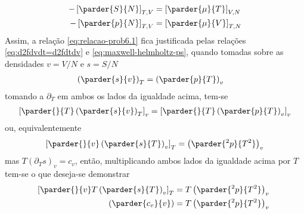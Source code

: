 \begin{prob}
\begin{sol}
\begin{subequations}
\begin{align}
			-\left[\parder{S}{N}\right]_{T,V}&=\left[\parder{\mu}{T}\right]_{V,N}\label{eq:maxwell-helmholtz-sm}\\
			-\left[\parder{p}{N}\right]_{T,V}&=\left[\parder{\mu}{V}\right]_{T,N}\label{eq:maxwell-helmholtz-pm}
		\end{align}
	\end{subequations}
	Assim, a relação \eqref{eq:relacao-prob6.1} fica justificada pelas relações \eqref{eq:d2fdvdt=d2fdtdv} e \eqref{eq:maxwell-helmholtz-ps}, quando tomadas sobre as densidades $v=V/N$ e $s=S/N$
	\begin{align}
		\left(\parder{s}{v}\right)_{T}&=\left(\parder{p}{T}\right)_{v}
	\end{align}
	tomando a $\partial_T$ em ambos os lados da igualdade acima, tem-se
	\begin{align}
		\left[\parder{}{T}\left(\parder{s}{v}\right)_T\right]_{v}=\left[\parder{}{T}\left(\parder{p}{T}\right)_v\right]_v
	\end{align}
	ou, equivalentemente
	\begin{align}
		\left[\parder{}{v}\left(\parder{s}{T}\right)_v\right]_T=\left(\parder{^2p}{T^2}\right)_v
	\end{align}
	mas $T(\partial_Ts)_v=c_v$, então, multiplicando ambos lados da igualdade acima por $T$ tem-se o que deseja-se demonstrar
	\begin{align}
		\begin{split}
			\left[\parder{}{v}T\left(\parder{s}{T}\right)_v\right]_T&=T\left(\parder{^2p}{T^2}\right)_v\\
			\left(\parder{c_v}{v}\right)&=T\left(\parder{^2p}{T^2}\right)_v\
		\end{split}
	\end{align}
\end{sol}
\end{prob}

